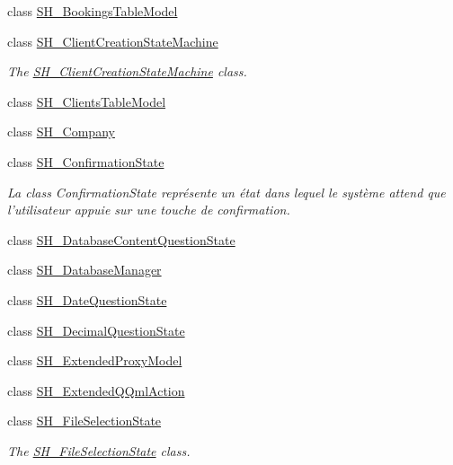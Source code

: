 \begin{DoxyCompactItemize}
class \hyperlink{classSimpleHotel_1_1SH__BookingsTableModel}{S\-H\-\_\-\-Bookings\-Table\-Model}
\item 
class \hyperlink{classSimpleHotel_1_1SH__ClientCreationStateMachine}{S\-H\-\_\-\-Client\-Creation\-State\-Machine}
\begin{DoxyCompactList}\small\item\em The \hyperlink{classSimpleHotel_1_1SH__ClientCreationStateMachine}{S\-H\-\_\-\-Client\-Creation\-State\-Machine} class. \end{DoxyCompactList}\item 
class \hyperlink{classSimpleHotel_1_1SH__ClientsTableModel}{S\-H\-\_\-\-Clients\-Table\-Model}
\item 
class \hyperlink{classSimpleHotel_1_1SH__Company}{S\-H\-\_\-\-Company}
\item 
class \hyperlink{classSimpleHotel_1_1SH__ConfirmationState}{S\-H\-\_\-\-Confirmation\-State}
\begin{DoxyCompactList}\small\item\em La class Confirmation\-State représente un état dans lequel le système attend que l'utilisateur appuie sur une touche de confirmation. \end{DoxyCompactList}\item 
class \hyperlink{classSimpleHotel_1_1SH__DatabaseContentQuestionState}{S\-H\-\_\-\-Database\-Content\-Question\-State}
\item 
class \hyperlink{classSimpleHotel_1_1SH__DatabaseManager}{S\-H\-\_\-\-Database\-Manager}
\item 
class \hyperlink{classSimpleHotel_1_1SH__DateQuestionState}{S\-H\-\_\-\-Date\-Question\-State}
\item 
class \hyperlink{classSimpleHotel_1_1SH__DecimalQuestionState}{S\-H\-\_\-\-Decimal\-Question\-State}
\item 
class \hyperlink{classSimpleHotel_1_1SH__ExtendedProxyModel}{S\-H\-\_\-\-Extended\-Proxy\-Model}
\item 
class \hyperlink{classSimpleHotel_1_1SH__ExtendedQQmlAction}{S\-H\-\_\-\-Extended\-Q\-Qml\-Action}
\item 
class \hyperlink{classSimpleHotel_1_1SH__FileSelectionState}{S\-H\-\_\-\-File\-Selection\-State}
\begin{DoxyCompactList}\small\item\em The \hyperlink{classSimpleHotel_1_1SH__FileSelectionState}{S\-H\-\_\-\-File\-Selection\-State} class. \end{DoxyCompactList}\item 

\end{DoxyCompactItemize}
